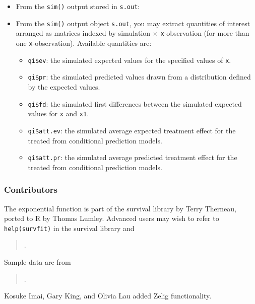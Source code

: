 \begin{itemize}
\item From the {\tt sim()} output stored in {\tt s.out}:
  
\item From the {\tt sim()} output object {\tt s.out}, you may extract
  quantities of interest arranged as matrices indexed by simulation
  $\times$ {\tt x}-observation (for more than one {\tt x}-observation).
  Available quantities are:

   \begin{itemize}
   \item {\tt qi\$ev}: the simulated expected values for the specified
     values of {\tt x}.
   \item {\tt qi\$pr}: the simulated predicted values drawn from a
     distribution defined by the expected values.
   \item {\tt qi\$fd}: the simulated first differences between the
     simulated expected values for {\tt x} and {\tt x1}.
   \item {\tt qi\$att.ev}: the simulated average expected treatment
     effect for the treated from conditional prediction models.  
   \item {\tt qi\$att.pr}: the simulated average predicted treatment
     effect for the treated from conditional prediction models.  
   \end{itemize}
\end{itemize}

\subsubsection{Contributors}

The exponential function is part of the survival library by Terry
Therneau, ported to R by Thomas Lumley.  Advanced users may wish to
refer to \texttt{help(survfit)} in the survival library and
\begin{verse}
.
\end{verse}

Sample data are from 
\begin{verse}
.
\end{verse}

Kosuke Imai, Gary King, and Olivia Lau added Zelig functionality. 












